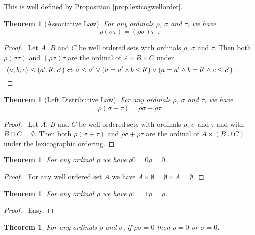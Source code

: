 \documentclass{book}
\let\qed\relax
\newtheorem{thm}[ax]{Theorem}
\theoremstyle{definition}
\begin{document}
This is well defined by Proposition \ref{prop:lexicogwellorder}.

\begin{thm}[Associative Law]
For any ordinals $\rho$, $\sigma$ and $\tau$, we have
\[ \rho (\sigma \tau) = (\rho \sigma) \tau \enspace . \]
\end{thm}

\begin{proof}
\pf\ Let $A$, $B$ and $C$ be well ordered sets with ordinals $\rho$, $\sigma$ and $\tau$. Then both $\rho (\sigma \tau)$ and $(\rho \sigma) \tau$ are the ordinal of $A \times B \times C$ under
\[ (a,b,c) \leq (a',b',c') \Leftrightarrow a \leq a' \vee (a = a' \wedge b \leq b') \vee (a = a' \wedge b = b' \wedge c \leq c') \enspace . \qquad \qed \]
\end{proof}

\begin{thm}[Left Distributive Law]
For any ordinals $\rho$, $\sigma$ and $\tau$, we have
\[ \rho (\sigma + \tau) = \rho \sigma + \rho \tau \]
\end{thm}

\begin{proof}
\pf\ Let $A$, $B$ and $C$ be well ordered sets with ordinals $\rho$, $\sigma$ and $\tau$ and with $B \cap C = \emptyset$. Then both $\rho (\sigma + \tau)$ and $\rho \sigma + \rho \tau$ are the ordinal of $A \times (B \cup C)$ under the lexicographic ordering. \qed
\end{proof}

\begin{thm}
For any ordinal $\rho$ we have $\rho 0 = 0 \rho = 0$.
\end{thm}

\begin{proof}
\pf\ For any well ordered set $A$ we have $A \times \emptyset = \emptyset \times A = \emptyset$. \qed
\end{proof}

\begin{thm}
For any ordinal $\rho$ we have $\rho 1 = 1 \rho = \rho$.
\end{thm}

\begin{proof}
\pf\ Easy. \qed
\end{proof}

\begin{thm}
For any ordinals $\rho$ and $\sigma$, if $\rho \sigma = 0$ then $\rho = 0$ or $\sigma = 0$.
\end{thm}
\end{document}
